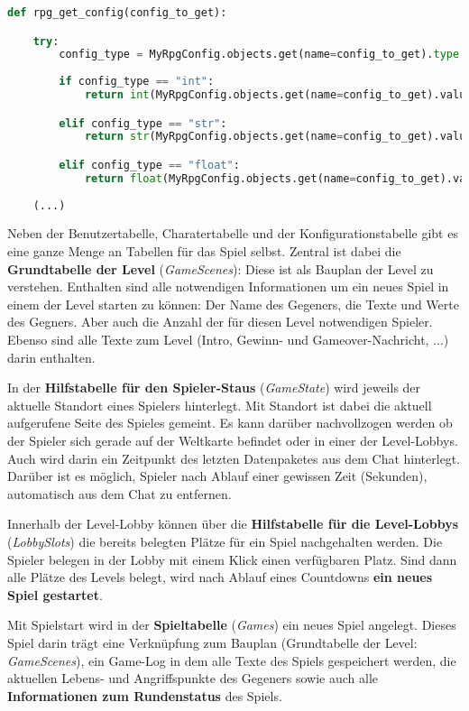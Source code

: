 \begin{lstlisting}[language=python]
def rpg_get_config(config_to_get):

    try: 
        config_type = MyRpgConfig.objects.get(name=config_to_get).type
    
        if config_type == "int":
            return int(MyRpgConfig.objects.get(name=config_to_get).value)

        elif config_type == "str":
            return str(MyRpgConfig.objects.get(name=config_to_get).value)

        elif config_type == "float":
            return float(MyRpgConfig.objects.get(name=config_to_get).value)
    
    (...)
\end{lstlisting}


Neben der Benutzertabelle, Charatertabelle und der Konfigurationstabelle gibt es eine ganze Menge an Tabellen für das Spiel selbst. Zentral ist dabei die \textbf{Grundtabelle der Level} (\textit{GameScenes}): Diese ist als Bauplan der Level zu verstehen. Enthalten sind alle notwendigen Informationen um ein neues Spiel in einem der Level starten zu können: Der Name des Gegeners, die Texte und Werte des Gegners. Aber auch die Anzahl der für diesen Level notwendigen Spieler. Ebenso sind alle Texte zum Level (Intro, Gewinn- und Gameover-Nachricht, ...) darin enthalten. 

In der \textbf{Hilfstabelle für den Spieler-Staus} (\textit{GameState}) wird jeweils der aktuelle Standort eines Spielers hinterlegt. Mit Standort ist dabei die aktuell aufgerufene Seite des Spieles gemeint. Es kann darüber nachvollzogen werden ob der Spieler sich gerade auf der Weltkarte befindet oder in einer der Level-Lobbys. Auch wird darin ein Zeitpunkt des letzten Datenpaketes aus dem Chat hinterlegt. Darüber ist es möglich, Spieler nach Ablauf einer gewissen Zeit (Sekunden), automatisch aus dem Chat zu entfernen. 

Innerhalb der Level-Lobby können über die \textbf{Hilfstabelle für die Level-Lobbys} (\textit{LobbySlots}) die bereits belegten Plätze für ein Spiel nachgehalten werden. Die Spieler belegen in der Lobby mit einem Klick einen verfügbaren Platz. Sind dann alle Plätze des Levels belegt, wird nach Ablauf eines Countdowns \textbf{ein neues Spiel gestartet}.

Mit Spielstart wird in der \textbf{Spieltabelle} (\textit{Games}) ein neues Spiel angelegt. Dieses Spiel darin trägt eine Verknüpfung zum Bauplan (Grundtabelle der Level: \textit{GameScenes}), ein Game-Log in dem alle Texte des Spiels gespeichert werden, die aktuellen Lebens- und Angriffspunkte des Gegeners sowie auch alle \textbf{Informationen zum Rundenstatus} des Spiels.

